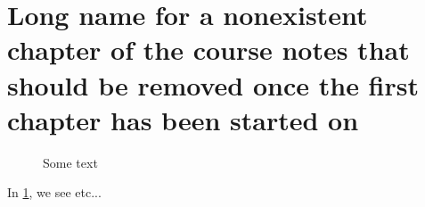 \section[Some chapter]{Long name for a nonexistent chapter of the course notes that should be removed once the first chapter has been started on}

\begin{figure}
	\centering
	
	\caption{Some text}
	\label{fig:a_figure}
\end{figure}

In \cref{fig:a_figure}, we see etc...